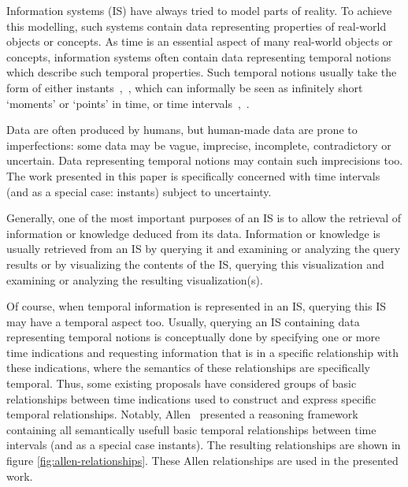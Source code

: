Information systems (IS) have always tried to model parts of reality. To achieve this modelling, such systems contain data representing properties of real-world objects or concepts. As time is an essential aspect of many real-world objects or concepts, information systems often contain data representing temporal notions which describe such temporal properties. Such temporal notions usually take the form of either instants~\cite{Dyreson1994},~\cite{Jensen1998}, which can informally be seen as infinitely short `moments' or `points' in time, or time intervals~\cite{Dyreson1994},~\cite{Jensen1998}.

Data are often produced by humans, but human-made data are prone to imperfections: some data may be vague, imprecise, incomplete, contradictory or uncertain. Data representing temporal notions may contain such imprecisions too. The work presented in this paper is specifically concerned with time intervals (and as a special case: instants) subject to uncertainty.

Generally, one of the most important purposes of an IS is to allow the retrieval of information or knowledge deduced from its data. Information or knowledge is usually retrieved from an IS by querying it and examining or analyzing the query results or by visualizing the contents of the IS, querying this visualization and examining or analyzing the resulting visualization(s).

Of course, when temporal information is represented in an IS, querying this IS may have a temporal aspect too. Usually, querying an IS containing data representing temporal notions is conceptually done by specifying one or more time indications and requesting information that is in a specific relationship with these indications, where the semantics of these relationships are specifically temporal. Thus, some existing proposals have considered groups of basic relationships between time indications used to construct and express specific temporal relationships. Notably, Allen~\cite{Allen1983} presented a reasoning framework containing all semantically usefull basic temporal relationships between time intervals (and as a special case instants). The resulting relationships are shown in figure \ref{fig:allen-relationships}. These Allen relationships are used in the presented work.

